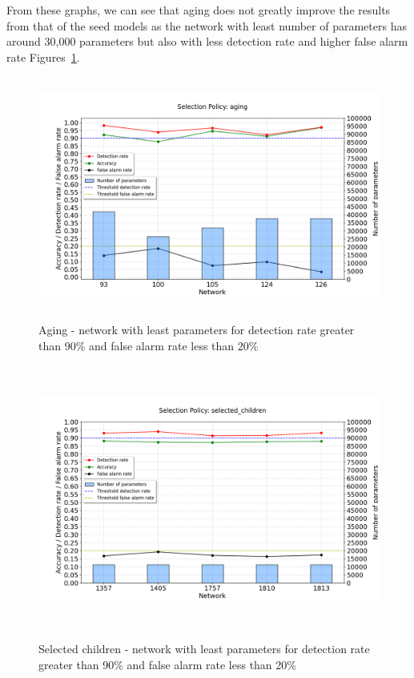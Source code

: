 From these graphs, we can see that aging does not greatly improve the results from that of the seed models as the network with least number of parameters has around 30,000 parameters but also with less detection rate and higher false alarm rate Figures~\ref{fig:aging_networks_least_nop}.

\begin{figure}[ht!]
    \centering
        \includegraphics[width=1.0\linewidth, height=8cm]{BachelorMasterThesis/ExperimentsAndResults/Figures/aging/aging_networks_least_nop.png}
        \caption{Aging - network with least parameters for detection rate greater than 90\% and false alarm rate less than 20\%}
        \label{fig:aging_networks_least_nop}
\end{figure}

\begin{figure}[ht!]
    \centering
        \includegraphics[width=1.0\linewidth, height=9cm]{BachelorMasterThesis/ExperimentsAndResults/Figures/selected_children/selected_children_networks_least_nop.png}
        \caption{Selected children - network with least parameters for detection rate greater than 90\% and false alarm rate less than 20\%}
        \label{fig:selected_children_networks_least_nop}
\end{figure}

